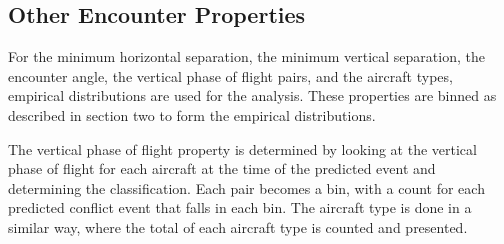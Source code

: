 \subsection{Other Encounter Properties}
For the minimum horizontal separation, the minimum vertical separation, the encounter angle, the vertical phase of flight pairs, and the aircraft types, empirical distributions are used for the analysis. These properties are binned as described in section two to form the empirical distributions. 

The vertical phase of flight property is determined by looking at the vertical phase of flight for each aircraft at the time of the predicted event and determining the classification. Each pair becomes a bin, with a count for each predicted conflict event that falls in each bin. The aircraft type is done in a similar way, where the total of each aircraft type is counted and presented.

